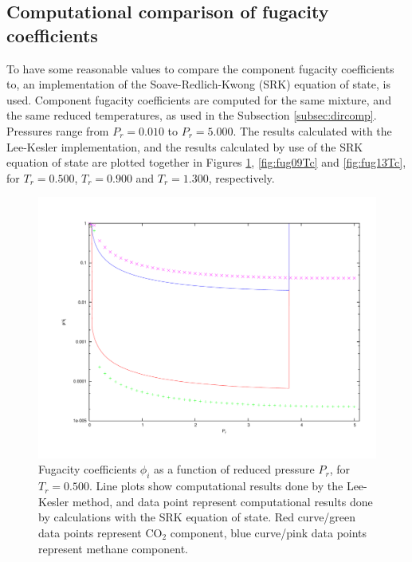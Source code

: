\documentclass[english]{../thermomemo/thermomemo}
\numberwithin{equation}{section}
\begin{document}
\subsection{Computational comparison of fugacity coefficients}
To have some reasonable values to compare the component fugacity coefficients to, an implementation of the Soave-Redlich-Kwong (SRK) equation of state, is used. Component fugacity coefficients are computed for the same mixture, and the same reduced temperatures, as used in the Subsection \ref{subsec:dircomp}. Pressures range from $P_r = 0.010$ to $P_r = 5.000$. The results calculated with the Lee-Kesler implementation, and the results calculated by use of the SRK equation of state are plotted together in Figures \ref{fig:fug05Tc}, \ref{fig:fug09Tc} and \ref{fig:fug13Tc}, for $T_r = 0.500$, $T_r = 0.900$ and $T_r = 1.300$, respectively.

\begin{figure}
	\centering
	\includegraphics[trim = 1.5cm 2cm 0 1cm, clip = true, width=13cm]{fug05Tc}
	\caption{Fugacity coefficients $\phi_i$ as a function of reduced pressure $P_r$, for $T_r = 0.500$. Line plots show computational results done by the Lee-Kesler method, and data point represent computational results done by calculations with the SRK equation of state. Red curve/green data points represent CO$_2$ component, blue curve/pink data points represent methane component.}
	\label{fig:fug05Tc}
\end{figure}
\end{document}
